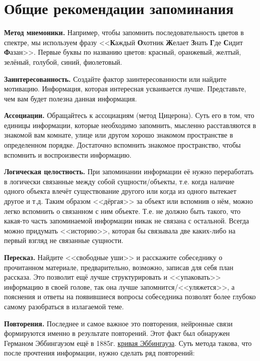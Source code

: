 \documentclass[12pt]{article}			%
\begin{document}
\section{Общие рекомендации запоминания}
\begin{outline}[enumerate]
\1 \textbf{Метод мнемоники.} Например, чтобы запомнить последовательность цветов в спектре, мы используем фразу <<\textbf{К}аждый \textbf{О}хотник \textbf{Ж}елает \textbf{З}нать \textbf{Г}де \textbf{С}идит \textbf{Ф}азан>>. Первые буквы по названию цветов: красный, оранжевый, желтый, зелёный, голубой, синий, фиолетовый.

\1 \textbf{Заинтересованность.} Создайте фактор заинтересованности или найдите мотивацию. Информация, которая интересная усваивается лучше. Представьте, чем вам будет полезна данная информация.

\1 \textbf{Ассоциации.} Обращайтесь к ассоциациям (метод Цицерона). Суть его в том, что единицы информации, которые необходимо запомнить, мысленно расставляются в знакомой вам комнате, улице или другом хорошо знакомом пространстве в определенном порядке. Достаточно вспомнить знакомое пространство, чтобы вспомнить и воспроизвести информацию.

\1 \textbf{Логическая целостность.} При запоминании информации её нужно переработать в логически связанные между собой сущности/объекты, т.е. когда наличие одного объекта влечёт существование другого или когда из одного вытекает другое и т.д. Таким образом <<дёргая>> за объект или вспомнив о нём, можно легко вспомнить о связанном с ним объекте. Т.е. не должно быть такого, что какая-то часть запоминаемой информации никак не связана с остальной. Всегда можно придумать <<историю>>, которая бы связывала две каких-либо на первый взгляд не связанные сущности.

\1 \textbf{Пересказ.} Найдите <<свободные уши>> и расскажите собеседнику о прочитанном материале, предварительно, возможно, записав для себя план рассказа. Это позволит ещё лучше структурировать и <<упаковать>> информацию в своей голове, так она лучше запомнится/<<уляжется>>, а пояснения и ответы на появившиеся вопросы собеседника позволят более глубоко самому разобраться в излагаемой теме.

\1 \textbf{Повторения.} Последнее и самое важное это повторения, нейронные связи формируются именно в результате повторений. Этот факт был обнаружен Германом Эббингаузом ещё в 1885г. \href{https://ru.wikipedia.org/wiki/%D0%9A%D1%80%D0%B8%D0%B2%D0%B0%D1%8F_%D0%B7%D0%B0%D0%B1%D1%8B%D0%B2%D0%B0%D0%BD%D0%B8%D1%8F}{кривая Эббингауза}. Суть метода такова, что после прочтения информации, нужно сделать ряд повторений:


\end{outline}
\end{document}
